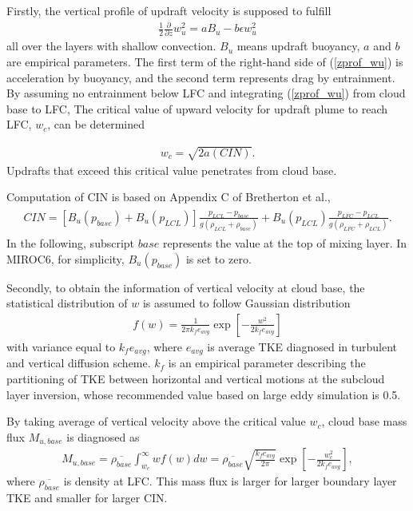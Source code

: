 Firstly, the vertical profile of updraft velocity is supposed to fulfill \begin{eqnarray}\label{zprof_wu}
    \frac{1}{2}\frac{\partial}{\partial z}w_u^2=aB_u-b\epsilon w_u^2\end{eqnarray} all over the layers with shallow convection. \(B_u\) means updraft buoyancy, \(a\) and \(b\) are empirical parameters. The first
term of the right-hand side of (\ref{zprof_wu}) is acceleration by buoyancy, and the second term represents drag by entrainment. By assuming no entrainment below LFC and integrating
(\ref{zprof_wu}) from cloud base to LFC, The critical value of upward velocity for updraft plume to reach LFC, \(w_c\), can be determined

\begin{eqnarray}\label{wc}
    w_c = \sqrt{2a(CIN)}.\end{eqnarray} Updrafts that exceed this critical value penetrates from cloud base.

Computation of CIN is based on Appendix C of Bretherton et al., \begin{eqnarray}\begin{aligned}
\label{def_CIN}
    CIN = [B_u(p_{base}) + B_u(p_{LCL})]\frac{p_{LCL}-p_{base}}{g(\rho_{LCL}+\rho_{base})} + B_u(p_{LCL})\frac{p_{LFC}-p_{LCL}}{g(\rho_{LFC}+\rho_{LCL})}.\end{aligned}\end{eqnarray} In the following, subscript
\(\mathit{base}\) represents the value at the top of mixing layer. In MIROC6, for simplicity, \(B_u(p_{base})\) is set to zero.

Secondly, to obtain the information of vertical velocity at cloud base, the statistical distribution of \(w\) is assumed to follow Gaussian distribution \begin{eqnarray}\label{distr_w}
    f(w) = \frac{1}{2\pi k_f e_{avg}}\exp\left[ -\frac{w^2}{2k_fe_{avg}}\right]\end{eqnarray} with variance equal to \(k_f e_{avg}\), where \(e_{avg}\) is average TKE diagnosed in turbulent and vertical diffusion
scheme. \(k_f\) is an empirical parameter describing the partitioning of TKE between horizontal and vertical motions at the subcloud layer inversion, whose recommended value based on large eddy
simulation is 0.5.

By taking average of vertical velocity above the critical value \(w_c\), cloud base mass flux \(M_{u,base}\) is diagnosed as \begin{eqnarray}\label{Mubase}
    M_{u,base}=\overline{\rho_{base}}\int_{w_c}^{\infty}wf(w)dw =\overline{\rho_{base}}\sqrt{\frac{k_f e_{avg}}{2\pi}}\exp\left[-\frac{w_c^2}{2k_fe_{avg}}\right],\end{eqnarray} where \(\overline{\rho_{base}}\) is
density at LFC. This mass flux is larger for larger boundary layer TKE and smaller for larger CIN.

